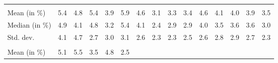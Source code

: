 \begin{tabular}{lllllllllllllll}
  \multicolumn{1}{r}{} &
  \multicolumn{1}{r}{} &
  \multicolumn{1}{r}{} &
  \multicolumn{1}{r}{} &
  \multicolumn{1}{r}{} &
  \multicolumn{1}{r}{} &
  \multicolumn{1}{r}{} &
  \multicolumn{1}{r}{} &
  \multicolumn{1}{r}{} &
  \multicolumn{1}{r}{} \\
\multicolumn{1}{l}{\hspace{2em}Mean (in $\%$)} &
  \multicolumn{1}{|r}{5.4} &
  \multicolumn{1}{r}{4.8} &
  \multicolumn{1}{r}{5.4} &
  \multicolumn{1}{r}{3.9} &
  \multicolumn{1}{r}{5.9} &
  \multicolumn{1}{r}{4.6} &
  \multicolumn{1}{r}{3.1} &
  \multicolumn{1}{r}{3.3} &
  \multicolumn{1}{r}{3.4} &
  \multicolumn{1}{r}{4.6} &
  \multicolumn{1}{r}{4.1} &
  \multicolumn{1}{r}{4.0} &
  \multicolumn{1}{r}{3.9} &
  \multicolumn{1}{r}{3.5} \\
\multicolumn{1}{l}{\hspace{2em}Median (in $\%$)} &
  \multicolumn{1}{|r}{4.9} &
  \multicolumn{1}{r}{4.1} &
  \multicolumn{1}{r}{4.8} &
  \multicolumn{1}{r}{3.2} &
  \multicolumn{1}{r}{5.4} &
  \multicolumn{1}{r}{4.1} &
  \multicolumn{1}{r}{2.4} &
  \multicolumn{1}{r}{2.9} &
  \multicolumn{1}{r}{2.9} &
  \multicolumn{1}{r}{4.0} &
  \multicolumn{1}{r}{3.5} &
  \multicolumn{1}{r}{3.6} &
  \multicolumn{1}{r}{3.6} &
  \multicolumn{1}{r}{3.0} \\
\multicolumn{1}{l}{\hspace{2em}Std. dev.} &
  \multicolumn{1}{|r}{4.1} &
  \multicolumn{1}{r}{4.7} &
  \multicolumn{1}{r}{2.7} &
  \multicolumn{1}{r}{3.0} &
  \multicolumn{1}{r}{3.1} &
  \multicolumn{1}{r}{2.6} &
  \multicolumn{1}{r}{2.3} &
  \multicolumn{1}{r}{2.3} &
  \multicolumn{1}{r}{2.5} &
  \multicolumn{1}{r}{2.6} &
  \multicolumn{1}{r}{2.8} &
  \multicolumn{1}{r}{2.9} &
  \multicolumn{1}{r}{2.7} &
  \multicolumn{1}{r}{2.3} \\
\multicolumn{1}{l}{\hspace{1em}{\textit{Additive term} ($\widehat{t}/\widetilde{p}$)}} &
  \multicolumn{1}{|r}{} &
  \multicolumn{1}{r}{} &
  \multicolumn{1}{r}{} &
  \multicolumn{1}{r}{} &
  \multicolumn{1}{r}{} &
  \multicolumn{1}{r}{} &
  \multicolumn{1}{r}{} &
  \multicolumn{1}{r}{} &
  \multicolumn{1}{r}{} &
  \multicolumn{1}{r}{} &
  \multicolumn{1}{r}{} &
  \multicolumn{1}{r}{} &
  \multicolumn{1}{r}{} &
  \multicolumn{1}{r}{} \\
\multicolumn{1}{l}{\hspace{2em}Mean (in $\%$)} &
  \multicolumn{1}{|r}{5.1} &
  \multicolumn{1}{r}{5.5} &
  \multicolumn{1}{r}{3.5} &
  \multicolumn{1}{r}{4.8} &
  \multicolumn{1}{r}{2.5} &

\end{tabular}
